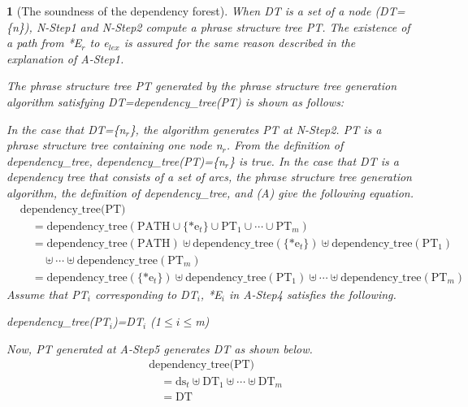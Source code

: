 \documentclass[english]{jnlp_1.4_rep}
\theoremstyle{break}
\newtheorem{theorem}{}[]
\theoremstyle{plain}
\theoremstyle{plain}
\begin{document}
\begin{theorem}[The soundness of the dependency forest]
{When DT is a set of a node (DT=\{n\}), N-Step1 and N-Step2 compute a
phrase structure tree PT. The existence of a path from *E$_r$ to
e$_{lex}$ is assured for the same reason described in the explanation
of A-Step1.

The phrase structure tree PT generated by the phrase structure tree
generation algorithm satisfying DT=dependency\_tree(PT) is shown as
follows:

In the case that DT=\{n$_r$\}, the algorithm generates PT at
N-Step2. PT is a phrase structure tree containing one node n$_r$. From
the definition of dependency\_tree, dependency\_tree(PT)=\{n$_r$\} is
true. In the case that DT is a dependency tree that consists of a set
of arcs, the phrase structure tree generation algorithm, the
definition of dependency\_tree, and (A) give the following equation.
\begin{align*}
 & \text{dependency\_tree(PT)}\\
 & \quad = \text{dependency\_tree}(\mathrm{PATH} \cup \{\mathrm{*e}_t\} \cup \mathrm{PT}_1 \cup \cdots \cup \mathrm{PT}_m) \\
 & \quad = \text{dependency\_tree}(\mathrm{PATH}) \uplus \text{dependency\_tree}(\{\mathrm{*e}_t\}) {\uplus}\text{dependency\_tree}(\mathrm{PT}_1)\\
 & \qquad \uplus \cdots \uplus \text{dependency\_tree}(\mathrm{PT}_m)\\
 & \quad = \text{dependency\_tree}(\{\mathrm{*e}_t\}) \uplus \text{dependency\_tree}(\mathrm{PT}_1) \uplus \cdots \uplus \text{dependency\_tree}(\mathrm{PT}_m)
\end{align*}
Assume that PT$_i$ corresponding to DT$_i$, *E$_i$ in A-Step4 satisfies the following.

dependency\_tree(PT$_i$)=DT$_i$  (1${\leq}i{\leq}$m)

\noindent
Now, PT generated at A-Step5 generates DT as shown below.
\begin{align*}
 & \text{dependency\_tree(PT)} \\
 & \quad = \mathrm{ds}_t \uplus \mathrm{DT}_1 \uplus \cdots \uplus \mathrm{DT}_m \\
 & \quad = \mathrm{DT}
\end{align*}
}
\end{theorem}
\end{document}
